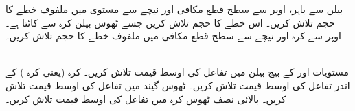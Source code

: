  بیلن  سے باہر،  اوپر سے سطح قطع مکافی  اور  نیچے سے مستوی  میں ملفوف    خطے  کا حجم تلاش کریں۔
اس خطے کا حجم تلاش کریں جسے ٹھوس بیلن   کرہ  سے کاٹتا ہے۔
اوپر سے کرہ  اور نیچے سے سطح قطع مکافی  میں ملفوف خطے کا حجم تلاش کریں۔

\\

مستویات  اور  کے بیچ بیلن   میں تفاعل  کی اوسط قیمت    تلاش کریں۔
کرہ  (یعنی کرہ )  کے اندر  تفاعل  کی اوسط قیمت تلاش کریں۔
ٹھوس گیند   میں تفاعل  کی اوسط قیمت تلاش کریں۔
بالائی نصف ٹھوس کرہ   میں تفاعل  کی اوسط قیمت تلاش کریں۔


